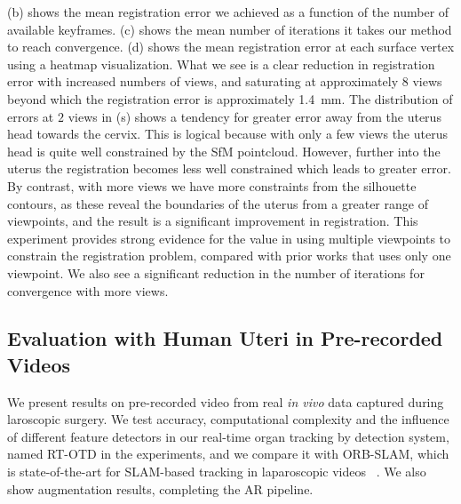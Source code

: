(b) shows the mean registration error we achieved as a function of the number of available keyframes. (c) shows the mean number of iterations it takes our method to reach convergence. (d) shows the mean registration error at each surface vertex using a heatmap visualization. What we see is a clear reduction in registration error with increased numbers of views, and saturating at approximately $8$ views beyond which the registration error is approximately \SI{1.4}{\milli\metre}. The distribution of errors at $2$ views in (s) shows a tendency for greater error away from the uterus head towards the cervix. This is logical because with only a few views the uterus head is quite well constrained by the SfM pointcloud. However, further into the uterus the registration becomes less well constrained which leads to greater error.
By contrast, with more views we have more constraints from the silhouette contours, as these reveal the boundaries of the uterus from a greater range of viewpoints, and the result is a significant improvement in registration. This experiment provides strong evidence for the value in using multiple viewpoints to constrain the registration problem, compared with prior works that uses only one viewpoint. We also see a significant reduction in the number of iterations for convergence with more views.
\subsection{Evaluation with Human Uteri in Pre-recorded Videos}
\label{sec:orbslam}
We present results on pre-recorded video from real \emph{in vivo} data captured during laroscopic surgery. We test accuracy, computational complexity and the influence of different feature detectors in our real-time organ tracking by detection system, named RT-OTD in the experiments, and we compare it with ORB-SLAM, which is state-of-the-art for SLAM-based tracking in laparoscopic videos ~\cite{orbslam_laparo}. We also show augmentation results, completing the AR pipeline.

